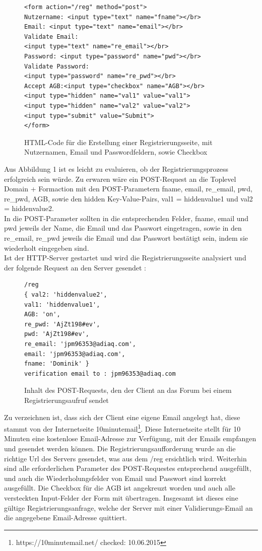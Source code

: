 \begin{figure}[h!]
\begin{lstlisting}[language=HTML5]
<form action="/reg" method="post">
Nutzername: <input type="text" name="fname"></br>
Email: <input type="text" name="email"></br>
Validate Email: 
<input type="text" name="re_email"></br>
Password: <input type="password" name="pwd"></br>
Validate Password: 
<input type="password" name="re_pwd"></br>
Accept AGB:<input type="checkbox" name="AGB"></br>
<input type="hidden" name="val1" value="val1">
<input type="hidden" name="val2" value="val2">
<input type="submit" value="Submit">
</form>
\end{lstlisting}
\caption{HTML-Code für die Erstellung einer Registrierungsseite, mit Nutzernamen, Email und Passwordfeldern, sowie Checkbox}
\end{figure}
\newpage

Aus Abbildung 1 ist es leicht zu evaluieren, ob der Registrierungsprozess erfolgreich sein würde. Zu erwaren wäre ein POST-Request an die Toplevel Domain + Formaction mit den POST-Parametern fname, email, re\_email, pwd, re\_pwd, AGB, sowie den hidden Key-Value-Pairs, val1 = hiddenvalue1 und val2 = hiddenvalue2.\\
In die POST-Parameter sollten in die entsprechenden Felder, fname, email und pwd jeweils der Name, die Email und das Passwort eingetragen, sowie in den re\_email, re\_pwd jeweils die Email und das Passwort bestätigt sein, indem sie wiederholt eingegeben sind.\\
Ist der HTTP-Server gestartet und wird die Registrierungsseite analysiert und der folgende Request an den Server gesendet :

\begin{figure}[ht]
\begin{lstlisting}[language=HTML5]
/reg
{ val2: 'hiddenvalue2',
val1: 'hiddenvalue1',
AGB: 'on',
re_pwd: 'AjZt198#ev',
pwd: 'AjZt198#ev',
re_email: 'jpm96353@adiaq.com',
email: 'jpm96353@adiaq.com',
fname: 'Dominik' }
verification email to : jpm96353@adiaq.com
\end{lstlisting}
\caption{Inhalt des POST-Requests, den der Client an das Forum bei einem Registrierungsaufruf sendet}
\end{figure}

Zu verzeichnen ist, dass sich der Client eine eigene Email angelegt hat, diese stammt von der Internetseite 10minutemail\footnote{https://10minutemail.net/ checked: 10.06.2015}.
Diese Internetseite stellt für 10 Minuten eine kostenlose Email-Adresse zur Verfügung, mit der Emails empfangen und gesendet werden können. Die Registrierungsaufforderung wurde an die richtige Url des Servers gesendet, was aus dem /reg ersichtlich wird. Weiterhin sind alle erforderlichen Parameter des POST-Requestes entsprechend ausgefüllt, und auch die Wiederholungsfelder von Email und Passwort sind korrekt ausgefüllt. Die Checkbox für die AGB ist angekreuzt worden und auch alle versteckten Input-Felder der Form mit übertragen. Insgesamt ist dieses eine gültige Registrierungsanfrage, welche der Server mit einer Validierungs-Email an die angegebene Email-Adresse quittiert.

